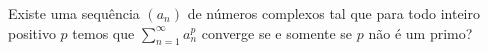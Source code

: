 Existe uma sequência \((a_n)\) de números complexos tal que para todo inteiro positivo \(p\) temos que \(\sum_{n = 1}^{\infty} a_n^p\) converge se e somente se \(p\) não é um primo?
